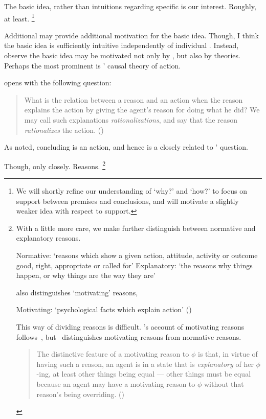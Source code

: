 \begin{note}
  The basic idea, rather than intuitions regarding specific  is our interest.
  Roughly, at least.%
  \footnote{
    We will shortly refine our understanding of `why?' and `how?' to focus on support between premises and conclusions, and will motivate a slightly weaker idea with respect to support.
  }

  Additional  may provide additional motivation for the basic idea.
  Though, I think the basic idea is sufficiently intuitive independently of individual .
  Instead, observe the basic idea may be motivated not only by , but also by theories.
  Perhaps the most prominent is \citeauthor{Davidson:1963aa}' causal theory of action.

  \citeauthor{Davidson:1963aa} opens  with the following question:

  \begin{quote}
    What is the relation between a reason and an action when the reason explains the action by giving the agent's reason for doing what he did?
    We may call such explanations \emph{rationalizations}, and say that the reason \emph{rationalizes} the action.%
    \mbox{}\hfill\mbox{(\citeyear[685]{Davidson:1963aa})}
  \end{quote}

  As noted, concluding is an action, and hence \qWhy{} is a closely related to \citeauthor{Davidson:1963aa}' question.

  Though, only closely.
  Reasons.%
  \footnote{
    With a little more care, we make further distinguish between normative and explanatory reasons.

    Normative: `reasons which show a given action, attitude, activity or outcome good, right, appropriate or called for'
    Explanatory: `the reasons why things happen, or why things are the way they are'
    \citeyear[410]{Hieronymi:2011aa}

    \citeauthor{Hieronymi:2011aa} also distinguishes `motivating' reasons,

    Motivating: `psychological facts which explain action'
    (\citeyear[411--412]{Hieronymi:2011aa})

    This way of dividing reasons is difficult.
    \citeauthor{Hieronymi:2011aa}'s account of motivating reasons follows~\textcite{Smith:1994wo}, but~\citeauthor{Smith:1994wo} distinguishes motivating reasons from normative reasons.

    \begin{quote}
      The distinctive feature of a motivating reason to \(\phi\) is that, in virtue of having such a reason, an agent is in a state that is \emph{explanatory} of her \(\phi\)-ing, at least other things being equal --- other things must be equal because an agent may have a motivating reason to \(\phi\) without that reason's being overriding.%
      \mbox{}\hfill\mbox{(\citeyear{Smith:1994wo})}
    \end{quote}

}
\end{note}
